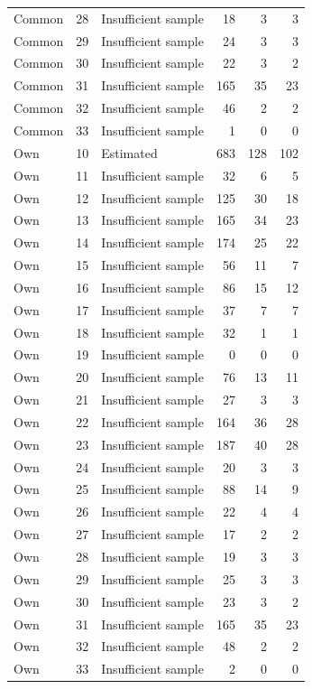 \begin{longtable}{lllrrr}
Common & 28 & Insufficient sample & 18 & 3 & 3 \\
Common & 29 & Insufficient sample & 24 & 3 & 3 \\
Common & 30 & Insufficient sample & 22 & 3 & 2 \\
Common & 31 & Insufficient sample & 165 & 35 & 23 \\
Common & 32 & Insufficient sample & 46 & 2 & 2 \\
Common & 33 & Insufficient sample & 1 & 0 & 0 \\
Own & 10 & Estimated & 683 & 128 & 102 \\
Own & 11 & Insufficient sample & 32 & 6 & 5 \\
Own & 12 & Insufficient sample & 125 & 30 & 18 \\
Own & 13 & Insufficient sample & 165 & 34 & 23 \\
Own & 14 & Insufficient sample & 174 & 25 & 22 \\
Own & 15 & Insufficient sample & 56 & 11 & 7 \\
Own & 16 & Insufficient sample & 86 & 15 & 12 \\
Own & 17 & Insufficient sample & 37 & 7 & 7 \\
Own & 18 & Insufficient sample & 32 & 1 & 1 \\
Own & 19 & Insufficient sample & 0 & 0 & 0 \\
Own & 20 & Insufficient sample & 76 & 13 & 11 \\
Own & 21 & Insufficient sample & 27 & 3 & 3 \\
Own & 22 & Insufficient sample & 164 & 36 & 28 \\
Own & 23 & Insufficient sample & 187 & 40 & 28 \\
Own & 24 & Insufficient sample & 20 & 3 & 3 \\
Own & 25 & Insufficient sample & 88 & 14 & 9 \\
Own & 26 & Insufficient sample & 22 & 4 & 4 \\
Own & 27 & Insufficient sample & 17 & 2 & 2 \\
Own & 28 & Insufficient sample & 19 & 3 & 3 \\
Own & 29 & Insufficient sample & 25 & 3 & 3 \\
Own & 30 & Insufficient sample & 23 & 3 & 2 \\
Own & 31 & Insufficient sample & 165 & 35 & 23 \\
Own & 32 & Insufficient sample & 48 & 2 & 2 \\
Own & 33 & Insufficient sample & 2 & 0 & 0 \\
\end{longtable}
\endgroup
{}
